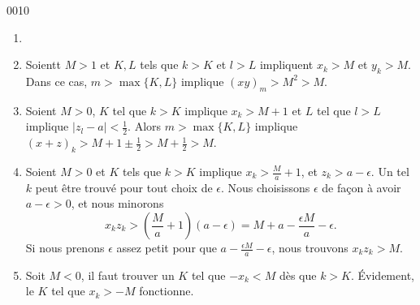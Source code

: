 
\begin{corrige}{0010}

\begin{enumerate}
\item 
\item Soientt $M>1$ et $K,L$ tels que $k>K$ et $l>L$ impliquent $x_k>M$ et $y_k>M$. Dans ce cas, $m>\max\{K,L\}$ implique $(xy)_m>M^2>M$.
\item Soient $M>0$, $K$ tel que $k>K$ implique $x_k>M+1$ et $L$ tel que $l>L$ implique $| z_l-a |<\frac{ 1 }{2}$. Alors $m>\max\{ K,L \}$ implique $(x+z)_k>M+1\pm\frac{ 1 }{2}>M+\frac{ 1 }{2}>M$.
\item Soient $M>0$ et $K$ tels que $k>K$ implique $x_k>\frac{ M }{ a }+1$, et $z_k>a-\epsilon$. Un tel $k$ peut être trouvé pour tout choix de $\epsilon$. Nous choisissons $\epsilon$ de façon à avoir $a-\epsilon>0$, et nous minorons
\begin{equation}
	x_kz_k>\left( \frac{ M }{ a }+1 \right)(a-\epsilon)=M+a-\frac{ \epsilon M }{ a }-\epsilon.
\end{equation}
Si nous prenons $\epsilon$ assez petit pour que $a-\frac{ \epsilon M }{ a }-\epsilon$, nous trouvons $x_kz_k>M$.

\item Soit $M<0$, il faut trouver un $K$ tel que $-x_k<M$ dès que $k>K$. Évidement, le $K$ tel que $x_k>-M$ fonctionne.

\end{enumerate}

\end{corrige}

